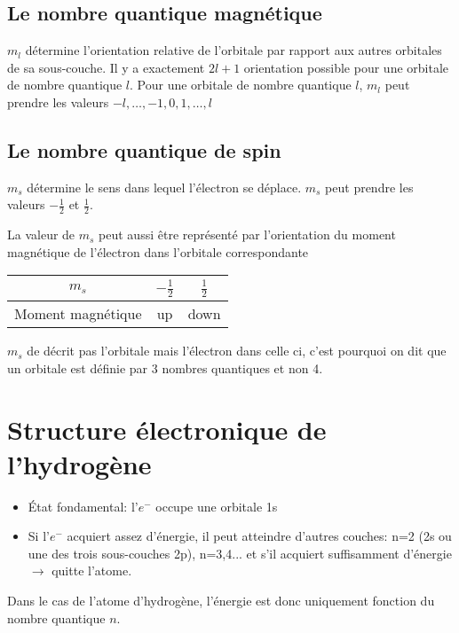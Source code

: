 \subsection{Le nombre quantique magnétique}
$m_l$ détermine l'orientation relative de l'orbitale par rapport aux autres orbitales de sa sous-couche.
Il y a exactement $2l + 1$ orientation possible pour une orbitale de nombre quantique $l$.
Pour une orbitale de nombre quantique $l$, $m_l$ peut prendre les valeurs $-l, \ldots, -1,  0, 1, \ldots, l$

\subsection{Le nombre quantique de spin}
$m_s$ détermine le sens dans lequel l'électron se déplace.
$m_s$ peut prendre les valeurs $-\frac{1}{2}$ et $\frac{1}{2}$.

La valeur de $m_s$ peut aussi être représenté par l'orientation du moment magnétique de l'électron dans l'orbitale correspondante
\begin{center}
	\begin{tabular}{c|cc}
		$m_s$ & $-\frac{1}{2}$ & $\frac{1}{2}$\\
		\hline
		Moment magnétique & up & down
	\end{tabular}
\end{center}

$m_s$ de décrit pas l'orbitale mais l'électron dans celle ci, c'est pourquoi on dit que un orbitale est définie par 3 nombres quantiques et non 4.


\section{Structure électronique de l'hydrogène}
\begin{itemize}
	\item \'Etat fondamental: l'$e^-$ occupe une orbitale 1s
	\item Si l'$e^-$ acquiert assez d'énergie, il peut atteindre d'autres couches: n=2 (2s ou une des trois sous-couches 2p), n=3,4... et s'il acquiert suffisamment d'énergie $\rightarrow$ quitte l'atome.
\end{itemize}

Dans le cas de l'atome d'hydrogène, l'énergie est donc uniquement fonction du nombre quantique $n$.

